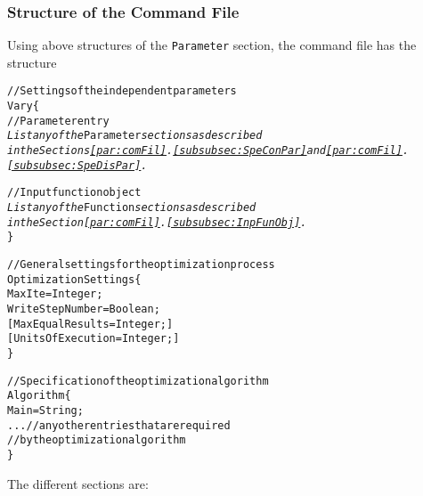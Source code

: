 
\subsubsection{Structure of the Command File}
\noindent Using above structures of the \verb$Parameter$ section, the command file has the structure
\begin{alltt}
// Settings of the independent parameters
Vary\{
   // Parameter entry
    {\it List any of the} \texttt{Parameter} {\it sections as described}
    {\it in the Sections \ref{par:comFil}.\ref{subsubsec:SpeConPar} and \ref{par:comFil}.\ref{subsubsec:SpeDisPar}.}

   // Input function object
    {\it List any of the} \texttt{Function} {\it sections as described}
    {\it in the Section \ref{par:comFil}.\ref{subsubsec:InpFunObj}.}
\}

// General settings for the optimization process
OptimizationSettings\{
   MaxIte           = Integer;
   WriteStepNumber  = Boolean;
 [ MaxEqualResults  = Integer; ]
 [ UnitsOfExecution = Integer; ]
\}

// Specification of the optimization algorithm
Algorithm\{
   Main = String;
   ... // any other entries that are required
       // by the optimization algorithm
\}
\end{alltt}
The different sections are:
